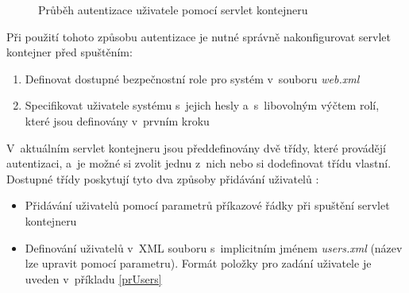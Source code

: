                 \begin{figure}[h!t]
                    \begin{center}
                        \caption{Průběh autentizace uživatele pomocí servlet kontejneru}
                        \label{imgSecurity}
                    \end{center}
                \end{figure}

                Při použití tohoto způsobu autentizace je nutné správně nakonfigurovat servlet kontejner před spuštěním:
                
                \begin{enumerate}
                    \item Definovat dostupné bezpečnostní role pro systém v~souboru \emph{web.xml}
                    \item Specifikovat uživatele systému s~jejich hesly a~s~libovolným výčtem rolí, které
                        jsou definovány v~prvním kroku
                \end{enumerate}

                V~aktuálním servlet kontejneru jsou předdefinovány dvě třídy, které provádějí autentizaci,
                a~je možné si zvolit jednu z~nich nebo si dodefinovat třídu vlastní.
                Dostupné třídy poskytují tyto dva způsoby přidávání uživatelů \cite{securityArchitectureWinstone}:

                \begin{itemize}
                    \item Přidávání uživatelů pomocí parametrů příkazové řádky při spuštění servlet kontejneru 
                    \item Definování uživatelů v~XML souboru s~implicitním jménem \emph{users.xml} (název
                    lze upravit pomocí parametru). Formát položky
                        pro zadání uživatele je uveden v~příkladu \ref{prUsers}
                \end{itemize}

